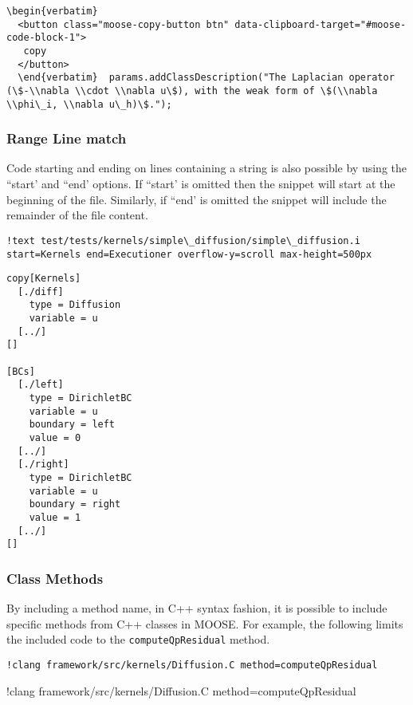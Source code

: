 \documentclass[]{report}
\begin{document}
\par
\begin{lstlisting}[caption=\href{https://github.com/idaholab/moose/blob/master/framework/src/kernels/Diffusion.C}{framework/src/kernels/Diffusion.C}]
\begin{verbatim}
  <button class="moose-copy-button btn" data-clipboard-target="#moose-code-block-1">
   copy
  </button>
  \end{verbatim}  params.addClassDescription("The Laplacian operator (\$-\\nabla \\cdot \\nabla u\$), with the weak form of \$(\\nabla \\phi\_i, \\nabla u\_h)\$.");
\end{lstlisting}\subsubsection{Range Line match\label{range-line-match}}
\par
Code starting and ending on lines containing a string is also possible by using the ``start' and ``end'
options. If ``start' is omitted then the snippet will start at the beginning of the file. Similarly, if ``end'
is omitted the snippet will include the remainder of the file content.\begin{lstlisting}
!text test/tests/kernels/simple\_diffusion/simple\_diffusion.i start=Kernels end=Executioner overflow-y=scroll max-height=500px
\end{lstlisting}
\par
\begin{lstlisting}[caption=\href{https://github.com/idaholab/moose/blob/master/test/tests/kernels/simple\_diffusion/simple\_diffusion.i}{test/tests/kernels/simple\_diffusion/simple\_diffusion.i}]
copy[Kernels]
  [./diff]
    type = Diffusion
    variable = u
  [../]
[]

[BCs]
  [./left]
    type = DirichletBC
    variable = u
    boundary = left
    value = 0
  [../]
  [./right]
    type = DirichletBC
    variable = u
    boundary = right
    value = 1
  [../]
[]
\end{lstlisting}\subsubsection{Class Methods\label{class-methods}}
\par
By including a method name, in C++ syntax fashion, it is possible to include specific methods from C++ classes in MOOSE. For example,
the following limits the included code to the \texttt{computeQpResidual} method.\begin{lstlisting}
!clang framework/src/kernels/Diffusion.C method=computeQpResidual
\end{lstlisting}!clang framework/src/kernels/Diffusion.C method=computeQpResidual
\end{document}
